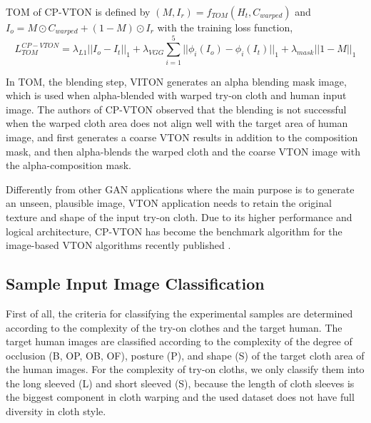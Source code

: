 TOM of CP-VTON is defined by 
$
 (M, I_r) = f_{TOM} ( H_t, C_{warped} )  
$
and 
$
   I_o = M \odot C_{warped} + (1-M) \odot I_r
$
with the training loss function, 
\begin{equation}
   L_{TOM}^{CP-VTON} = \lambda_{L1}  || I_o - I_t ||_1  + 
             \lambda_{VGG} \sum_{i=1}^{5} || \phi_i(I_o) - \phi_i(I_t)||_1  + 
             \lambda_{mask} || 1 - M ||_1      
\end{equation}



In TOM, the blending step, VITON generates an alpha blending mask image, which is used when alpha-blended with warped try-on cloth and human input image. The authors of CP-VTON observed that the blending is not successful when the warped  cloth area does not align well with the target area of human image, and first generates a coarse VTON results in addition to the composition mask, and then alpha-blends the warped cloth and the coarse VTON image with the alpha-composition mask.       


Differently from other GAN applications where the main purpose is to generate an unseen, plausible image, VTON application needs to retain the original texture and shape of the input try-on cloth. Due to its higher performance and logical architecture, CP-VTON has become the benchmark algorithm for the image-based VTON algorithms recently published \cite{Sun2019ImageBasedVT,Yu_2019_ICCV,jae2019viton}.  




 
\subsection{Sample Input Image Classification}

First of all, the criteria for classifying the experimental samples are determined according to the complexity of the try-on clothes and the target human. The target human images are classified according to the complexity of the degree of occlusion (B, OP, OB, OF), posture (P), and shape (S) of the target cloth area of the human images. For the complexity of try-on cloths, we only classify them into the long sleeved (L) and short sleeved (S), because the length of cloth sleeves is the biggest component in cloth warping and the used dataset does not have full diversity in cloth  style.    

